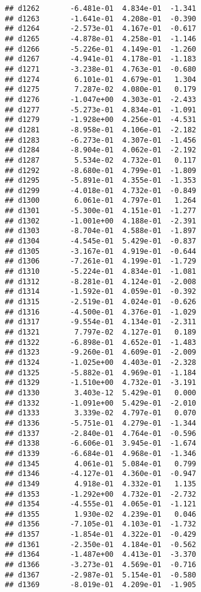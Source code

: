 \documentclass[
]{article}
\begin{document}
\begin{verbatim}
## d1262       -6.481e-01  4.834e-01  -1.341
## d1263       -1.641e-01  4.208e-01  -0.390
## d1264       -2.573e-01  4.167e-01  -0.617
## d1265       -4.878e-01  4.258e-01  -1.146
## d1266       -5.226e-01  4.149e-01  -1.260
## d1267       -4.941e-01  4.178e-01  -1.183
## d1271       -3.238e-01  4.763e-01  -0.680
## d1274        6.101e-01  4.679e-01   1.304
## d1275        7.287e-02  4.080e-01   0.179
## d1276       -1.047e+00  4.303e-01  -2.433
## d1277       -5.273e-01  4.834e-01  -1.091
## d1279       -1.928e+00  4.256e-01  -4.531
## d1281       -8.958e-01  4.106e-01  -2.182
## d1283       -6.273e-01  4.307e-01  -1.456
## d1284       -8.904e-01  4.062e-01  -2.192
## d1287        5.534e-02  4.732e-01   0.117
## d1292       -8.680e-01  4.799e-01  -1.809
## d1295       -5.891e-01  4.355e-01  -1.353
## d1299       -4.018e-01  4.732e-01  -0.849
## d1300        6.061e-01  4.797e-01   1.264
## d1301       -5.300e-01  4.151e-01  -1.277
## d1302       -1.001e+00  4.188e-01  -2.391
## d1303       -8.704e-01  4.588e-01  -1.897
## d1304       -4.545e-01  5.429e-01  -0.837
## d1305       -3.167e-01  4.919e-01  -0.644
## d1306       -7.261e-01  4.199e-01  -1.729
## d1310       -5.224e-01  4.834e-01  -1.081
## d1312       -8.281e-01  4.124e-01  -2.008
## d1314       -1.592e-01  4.059e-01  -0.392
## d1315       -2.519e-01  4.024e-01  -0.626
## d1316       -4.500e-01  4.376e-01  -1.029
## d1317       -9.554e-01  4.134e-01  -2.311
## d1321        7.797e-02  4.127e-01   0.189
## d1322       -6.898e-01  4.652e-01  -1.483
## d1323       -9.260e-01  4.609e-01  -2.009
## d1324       -1.025e+00  4.403e-01  -2.328
## d1325       -5.882e-01  4.969e-01  -1.184
## d1329       -1.510e+00  4.732e-01  -3.191
## d1330        3.403e-12  5.429e-01   0.000
## d1332       -1.091e+00  5.429e-01  -2.010
## d1333        3.339e-02  4.797e-01   0.070
## d1336       -5.751e-01  4.279e-01  -1.344
## d1337       -2.840e-01  4.764e-01  -0.596
## d1338       -6.606e-01  3.945e-01  -1.674
## d1339       -6.684e-01  4.968e-01  -1.346
## d1345        4.061e-01  5.084e-01   0.799
## d1346       -4.127e-01  4.360e-01  -0.947
## d1349        4.918e-01  4.332e-01   1.135
## d1353       -1.292e+00  4.732e-01  -2.732
## d1354       -4.555e-01  4.065e-01  -1.121
## d1355        1.930e-02  4.239e-01   0.046
## d1356       -7.105e-01  4.103e-01  -1.732
## d1357       -1.854e-01  4.322e-01  -0.429
## d1361       -2.350e-01  4.184e-01  -0.562
## d1364       -1.487e+00  4.413e-01  -3.370
## d1366       -3.273e-01  4.569e-01  -0.716
## d1367       -2.987e-01  5.154e-01  -0.580
## d1369       -8.019e-01  4.209e-01  -1.905

\end{verbatim}
\end{document}
